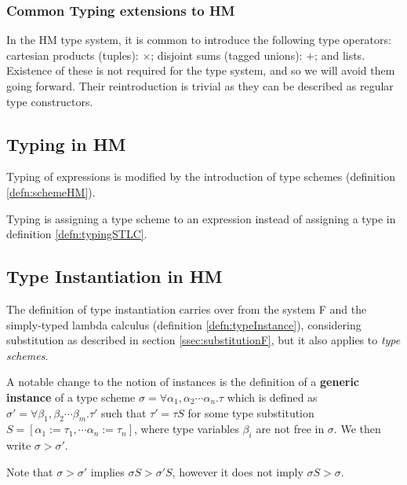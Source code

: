 \subsubsection{Common Typing extensions to HM}
\label{sssec:typingExt}

In the HM type system, it is common to introduce the following type operators: cartesian products (tuples): $\times$; disjoint sums (tagged unions): $+$; and lists. Existence of these is not required for the type system, and so we will avoid them going forward. Their reintroduction is trivial as they can be described as regular type constructors.

\subsection{Typing in HM}

Typing of expressions is modified by the introduction of type schemes (definition \ref{defn:schemeHM}).
\begin{defn}[Typing in HM]
    Typing is assigning a type scheme to an expression instead of assigning a type in definition \ref{defn:typingSTLC}.
\end{defn}

\subsection{Type Instantiation in HM}

The definition of type instantiation carries over from the system F and the simply-typed lambda calculus (definition \ref{defn:typeInstance}), considering substitution as described in section \ref{ssec:substitutionF}, but it also applies to \emph{type schemes}.

\begin{defn}
    A notable change to the notion of instances is the definition of a \textbf{generic instance} of a type scheme $\sigma = \forall \alpha_1, \alpha_2 \cdots \alpha_n . \tau$ which is defined as $\sigma' = \forall \beta_1, \beta_2 \cdots \beta_m . \tau'$ such that $\tau' = \tau S$ for some type substitution $S = [\alpha_1 := \tau_1, \cdots \alpha_n := \tau_n]$, where type variables $\beta_i$ are not free in $\sigma$. We then write $\sigma > \sigma'$. \cite{damas1982principal}
\end{defn}

Note that $\sigma > \sigma'$ implies $\sigma S > \sigma' S$, however it does not imply $\sigma S > \sigma$.

